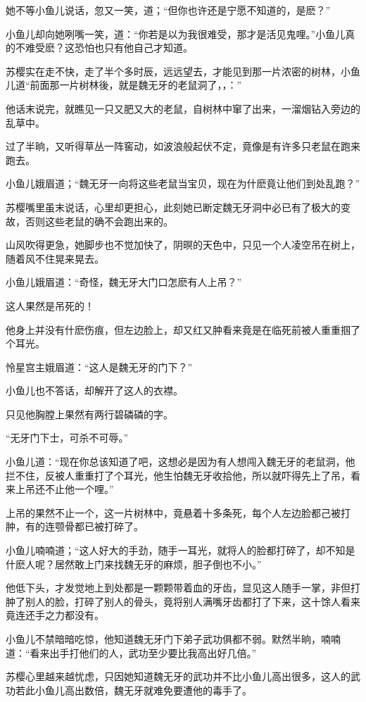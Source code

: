 \documentclass[12pt,oneside]{book}
\begin{document}
她不等小鱼儿说话，忽又一笑，道；``但你也许还是宁愿不知道的，是麽？''

小鱼儿却向她咧嘴一笑，道：``你若是以为我很难受，那才是活见鬼哩。''小鱼儿真的不难受麽？这恐怕也只有他自己才知道。

苏樱实在走不快，走了半个多时辰，远远望去，才能见到那一片浓密的树林，小鱼儿道``前面那一片树林後，就是魏无牙的老鼠洞了，，：''

他话末说完，就瞧见一只又肥又大的老鼠，自树林中窜了出来，一溜烟钻入旁边的乱草中。

过了半晌，又听得草丛一阵窖动，如波浪般起伏不定，竟像是有许多只老鼠在跑来跑去。

小鱼儿娥眉道；``魏无牙一向将这些老鼠当宝贝，现在为什麽竟让他们到处乱跑？''

苏樱嘴里虽末说话，心里却更担心，此刻她已断定魏无牙洞中必已有了极大的变故，否则这些老鼠的确不会跑出来的。

山风吹得更急，她脚步也不觉加快了，阴暝的天色中，只见一个人凌空吊在树上，随着风不住晃来晃去。

小鱼儿娥眉道：``奇怪，魏无牙大门口怎麽有人上吊？''

这人果然是吊死的！

他身上并没有什麽伤痕，但左边脸上，却又红又肿看来竟是在临死前被人重重掴了个耳光。

怜星宫主娥眉道：``这人是魏无牙的门下？''

小鱼儿也不答话，却解开了这人的衣襟。

只见他胸膛上果然有两行碧磷磷的字。

``无牙门下士，可杀不可辱。''

小鱼儿道：``现在你总该知道了吧，这想必是因为有人想闯入魏无牙的老鼠洞，他拦不住，反被人重重打了个耳光，他生怕魏无牙收拾他，所以就吓得先上了吊，看来上吊还不止他一个哩。''

上吊的果然不止一个，这一片树林中，竟悬着十多条死，每个人左边脸都己被打肿，有的连颚骨都已被打碎了。

小鱼儿喃喃道；``这人好大的手劲，随手一耳光，就将人的脸都打碎了，却不知是什麽人呢？居然敢上门来找魏无牙的麻烦，胆子倒也不小。''

他低下头，才发觉地上到处都是一颗颗带着血的牙齿，显见这人随手一掌，非但打肿了别人的脸，打碎了别人的骨头，竟将别人满嘴牙齿都打了下来，这十馀人看来竟连还手之力都没有。

小鱼儿不禁暗暗吃惊，他知道魏无牙门下弟子武功俱都不弱。默然半晌，喃喃道：``看来出手打他们的人，武功至少要比我高出好几倍。''

苏樱心里越来越忧虑，只因她知道魏无牙的武功并不比小鱼儿高出很多，这人的武功若此小鱼儿高出数倍，魏无牙就难免要遭他的毒手了。
\end{document}
